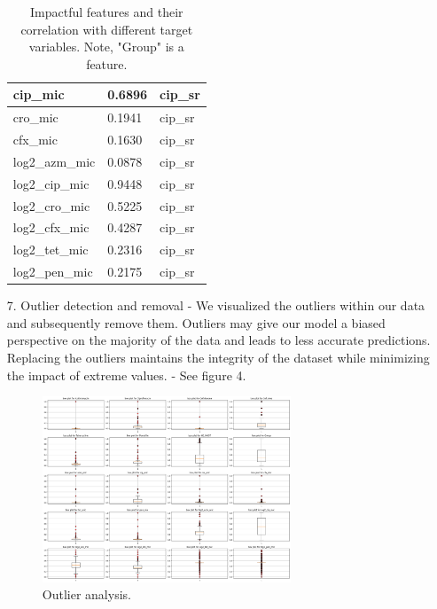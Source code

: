 \documentclass[manuscript,screen,review, nonacm]{acmart}
\begin{document}
\begin{itemize}
\begin{table}[H]
\begin{tabular}{|l|l|l|}
                cip\_mic                   & 0.6896               & cip\_sr         \\ \hline
                cro\_mic                   & 0.1941               & cip\_sr         \\ \hline
                cfx\_mic                   & 0.1630               & cip\_sr         \\ \hline
                log2\_azm\_mic             & 0.0878               & cip\_sr         \\ \hline
                log2\_cip\_mic             & 0.9448               & cip\_sr         \\ \hline
                log2\_cro\_mic             & 0.5225               & cip\_sr         \\ \hline
                log2\_cfx\_mic             & 0.4287               & cip\_sr         \\ \hline
                log2\_tet\_mic             & 0.2316               & cip\_sr         \\ \hline
                log2\_pen\_mic             & 0.2175               & cip\_sr         \\ \hline
                \end{tabular}
                \caption{Impactful features and their correlation with different target variables. Note, "Group" is a feature.}
            \end{table}

    \item[7.] Outlier detection and removal - We visualized the outliers within our data and subsequently remove them. Outliers may give our model a biased perspective on the majority of the data and leads to less accurate predictions. Replacing the outliers maintains the integrity of the dataset while minimizing the impact of extreme values. - See figure 4.
            \begin{figure}[H]
                \centering
                \vspace{-10pt}
                \includegraphics[width=0.7\textwidth]{figures/outlier.png}
                \caption{Outlier analysis.}
                \vspace{-10pt}
            \end{figure}


\end{itemize}
\end{document}
